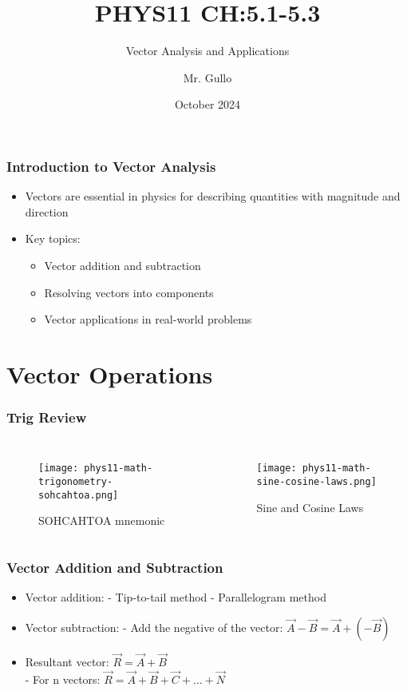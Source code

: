 \documentclass{beamer}
\title[ Vector Analysis]{PHYS11 CH:5.1-5.3}
\subtitle{Vector Analysis and Applications }
\author[Mr. Gullo]{Mr. Gullo}
\date[Oct 2024]{October 2024}
\begin{document}
\frame{\titlepage}

\begin{frame}
\frametitle{Introduction to Vector Analysis}
\begin{itemize}
    \item Vectors are essential in physics for describing quantities with magnitude and direction
    \item Key topics:
    \begin{itemize}
        \item Vector addition and subtraction
        \item Resolving vectors into components
        \item Vector applications in real-world problems
    \end{itemize}
\end{itemize}
\end{frame}

\section{Vector Operations}

\begin{frame}
\frametitle{Trig Review}
\begin{columns}[T] %
    \begin{figure}
        \centering
        \texttt{[image: phys11-math-trigonometry-sohcahtoa.png]}
        \caption{SOHCAHTOA mnemonic}
    \end{figure}

    \begin{figure}
        \centering
        \texttt{[image: phys11-math-sine-cosine-laws.png]}
        \caption{Sine and Cosine Laws}
    \end{figure}
\end{columns}
\end{frame}

\begin{frame}
\frametitle{Vector Addition and Subtraction}
\begin{itemize}
    \item Vector addition:
- Tip-to-tail method
- Parallelogram method

\item Vector subtraction:
- Add the negative of the vector: $\vec{A} - \vec{B} = \vec{A} + (-\vec{B})$

\item Resultant vector: $\vec{R} = \vec{A} + \vec{B}$
 \\
- For n vectors: $\vec{R} = \vec{A} + \vec{B} + \vec{C} + ... + \vec{N}$
\end{itemize}
\end{frame}
\end{document}
